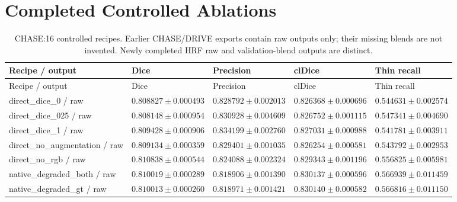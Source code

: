 \documentclass[jimaging,article,submit,pdftex,moreauthors]{Definitions/mdpi}
\begin{document}
\section{Completed Controlled Ablations}

\begingroup\scriptsize\setlength{\tabcolsep}{3pt}\renewcommand{\arraystretch}{1.12}\setlength{\LTleft}{-\extralength}\setlength{\LTright}{0pt plus1fill}\setlength{\LTcapwidth}{\dimexpr 15.000cm+24pt\relax}\captionsetup[longtable]{margin=0pt,width=\LTcapwidth,singlelinecheck=false,justification=raggedright}\makeatletter\long{}\makeatother
\begin{longtable}{@{}>{\raggedright\arraybackslash}p{5.0cm}>{\raggedright\arraybackslash}p{2.5cm}>{\raggedright\arraybackslash}p{2.5cm}>{\raggedright\arraybackslash}p{2.5cm}>{\raggedright\arraybackslash}p{2.5cm}@{}}
\caption{CHASE:16 controlled recipes. Earlier CHASE/DRIVE exports contain raw outputs only; their missing blends are not invented. Newly completed HRF raw and validation-blend outputs are distinct.}\label{tab:controls-CHASE}\\
\toprule
Recipe / output & Dice & Precision & clDice & Thin recall\\
\midrule\endfirsthead
\toprule
Recipe / output & Dice & Precision & clDice & Thin recall\\
\midrule\endhead
\bottomrule\endfoot
direct\_dice\_0 / raw & $0.808827\pm 0.000493$ & $0.828792\pm 0.002013$ & $0.826368\pm 0.000696$ & $0.544631\pm 0.002574$\\
direct\_dice\_025 / raw & $0.808148\pm 0.000954$ & $0.830928\pm 0.004609$ & $0.826752\pm 0.001115$ & $0.547341\pm 0.004690$\\
direct\_dice\_1 / raw & $0.809428\pm 0.000906$ & $0.834199\pm 0.002760$ & $0.827031\pm 0.000988$ & $0.541781\pm 0.003911$\\
direct\_no\_augmentation / raw & $0.809134\pm 0.000359$ & $0.829401\pm 0.001035$ & $0.826254\pm 0.000581$ & $0.543792\pm 0.002953$\\
direct\_no\_rgb / raw & $0.810838\pm 0.000544$ & $0.824088\pm 0.002324$ & $0.829343\pm 0.001196$ & $0.556825\pm 0.005981$\\
native\_degraded\_both / raw & $0.810019\pm 0.000289$ & $0.818906\pm 0.001390$ & $0.830137\pm 0.000596$ & $0.566939\pm 0.011459$\\
native\_degraded\_gt / raw & $0.810013\pm 0.000260$ & $0.818971\pm 0.001421$ & $0.830140\pm 0.000582$ & $0.566816\pm 0.011150$\\

\end{longtable}
\end{document}
